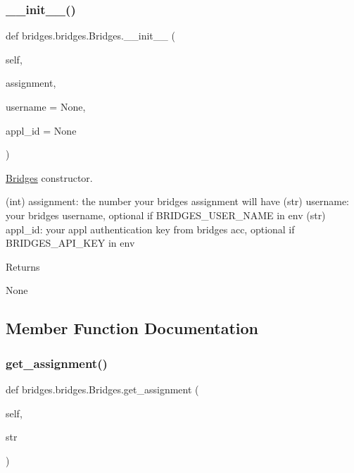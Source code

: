 \subsubsection{\texorpdfstring{\+\_\+\+\_\+init\+\_\+\+\_\+()}{\_\_init\_\_()}}
{\footnotesize\ttfamily def bridges.\+bridges.\+Bridges.\+\_\+\+\_\+init\+\_\+\+\_\+ (\begin{DoxyParamCaption}\item[{}]{self,  }\item[{}]{assignment,  }\item[{}]{username = {\ttfamily None},  }\item[{}]{appl\+\_\+id = {\ttfamily None} }\end{DoxyParamCaption})}



\hyperlink{classbridges_1_1bridges_1_1_bridges}{Bridges} constructor. 

(int) assignment\+: the number your bridges assignment will have (str) username\+: your bridges username, optional if B\+R\+I\+D\+G\+E\+S\+\_\+\+U\+S\+E\+R\+\_\+\+N\+A\+ME in env (str) appl\+\_\+id\+: your appl authentication key from bridges acc, optional if B\+R\+I\+D\+G\+E\+S\+\_\+\+A\+P\+I\+\_\+\+K\+EY in env \begin{DoxyReturn}{Returns}


None 
\end{DoxyReturn}


\subsection{Member Function Documentation}
\mbox{\label{classbridges_1_1bridges_1_1_bridges_a1e7bd56f6a3beb03c91fc989cf3f7eb8}} 
\subsubsection{\texorpdfstring{get\+\_\+assignment()}{get\_assignment()}}
{\footnotesize\ttfamily def bridges.\+bridges.\+Bridges.\+get\+\_\+assignment (\begin{DoxyParamCaption}\item[{}]{self,  }\item[{}]{str }\end{DoxyParamCaption})}



